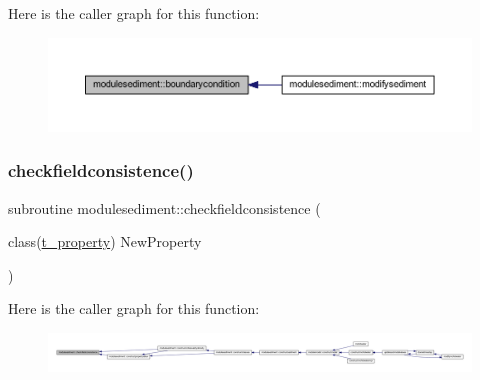 Here is the caller graph for this function\+:\nopagebreak
\begin{figure}[H]
\begin{center}
\leavevmode
\includegraphics[width=350pt]{namespacemodulesediment_a3b2c4d5436d7504be300368e5a584c64_icgraph}
\end{center}
\end{figure}
\mbox{\label{namespacemodulesediment_ade328a003b435bdea1339006c7c14db5}} 
\subsubsection{\texorpdfstring{checkfieldconsistence()}{checkfieldconsistence()}}
{\footnotesize\ttfamily subroutine modulesediment\+::checkfieldconsistence (\begin{DoxyParamCaption}\item[{class(\mbox{\hyperlink{structmodulesediment_1_1t__property}{t\+\_\+property}})}]{New\+Property }\end{DoxyParamCaption})\hspace{0.3cm}{\ttfamily [private]}}

Here is the caller graph for this function\+:\nopagebreak
\begin{figure}[H]
\begin{center}
\leavevmode
\includegraphics[width=350pt]{namespacemodulesediment_ade328a003b435bdea1339006c7c14db5_icgraph}
\end{center}
\end{figure}
\mbox{\label{namespacemodulesediment_ab89eafb956bc952759092de44da7a0b8}} 
